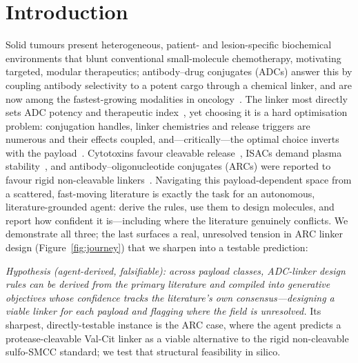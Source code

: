 \documentclass[10pt]{article}
\begin{document}
\section{Introduction}Solid tumours present heterogeneous, patient- and lesion-specific biochemical environments that blunt conventional small-molecule chemotherapy, motivating targeted, modular therapeutics; antibody--drug conjugates (ADCs) answer this by coupling antibody selectivity to a potent cargo through a chemical linker, and are now among the fastest-growing modalities in oncology~\cite{beck2017,adcapp2019}. The linker most directly sets ADC potency and therapeutic index~\cite{su2021,peng2021}, yet choosing it is a hard optimisation problem: conjugation handles, linker chemistries and release triggers are numerous and their effects coupled, and---critically---the optimal choice inverts with the payload~\cite{su2021zhang}. Cytotoxins favour cleavable release~\cite{balamkundu2023}, ISACs demand plasma stability~\cite{isac2022,isac2025}, and antibody--oligonucleotide conjugates (ARCs) were reported to favour rigid non-cleavable linkers~\cite{arc2025}. Navigating this payload-dependent space from a scattered, fast-moving literature is exactly the task for an autonomous, literature-grounded agent: derive the rules, use them to design molecules, and report how confident it is---including where the literature genuinely conflicts. We demonstrate all three; the last surfaces a real, unresolved tension in ARC linker design (Figure~\ref{fig:journey}) that we sharpen into a testable prediction:

\noindent\emph{Hypothesis (agent-derived, falsifiable): across payload classes, ADC-linker design rules can be derived from the primary literature and compiled into generative objectives whose confidence tracks the literature's own consensus---designing a viable linker for each payload and flagging where the field is unresolved.} Its sharpest, directly-testable instance is the ARC case, where the agent predicts a protease-cleavable Val-Cit linker as a viable alternative to the rigid non-cleavable sulfo-SMCC standard; we test that structural feasibility in silico.
\end{document}
